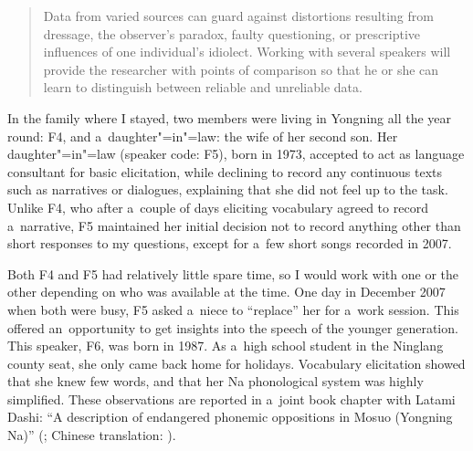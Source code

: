 \begin{quotation}
  Data from varied sources can guard against distortions resulting from dressage, the observer’s
  paradox, faulty questioning, or prescriptive influences of one individual’s idiolect. Working
  with several speakers will provide the researcher with points of comparison so that he or she can
  learn to distinguish between reliable and unreliable data.~\citep[180–181]{Chelliahetal2011}
\end{quotation}

In the family where I stayed, two members were living in Yongning all the year round: F4, and
a~daughter"=in"=law: the wife of her second son. Her daughter"=in"=law (speaker code: F5), born in 1973,
accepted to act as language consultant for basic elicitation, while declining to record any
continuous texts such as narratives or dialogues, explaining that she did not feel up to the task. Unlike F4,
who after a~couple of days eliciting vocabulary agreed to record a~narrative, F5 maintained her
initial decision not to record anything other than short responses to my questions, except for a~few
short songs recorded in 2007.

Both F4 and F5 had relatively little spare time, so I would work with one or the other depending on who was available at the time. One day in December 2007 when both were busy, F5 asked a~niece to “replace”
her for a~work session. This offered an~opportunity to get insights into the speech of the younger
generation. This speaker, F6, was born in 1987. As a~high school student in the Ninglang county
seat, she only came back home for holidays. Vocabulary elicitation showed that she knew few words,
and that her Na phonological system was highly simplified. These observations are reported in
a~joint book chapter with Latami Dashi: “A description of endangered phonemic oppositions in Mosuo
(Yongning Na)” (\citealt{michaudetal2011}; Chinese translation: \citealt{mikemike-Alexis-michaudetal2010}).
{\largerpage}


